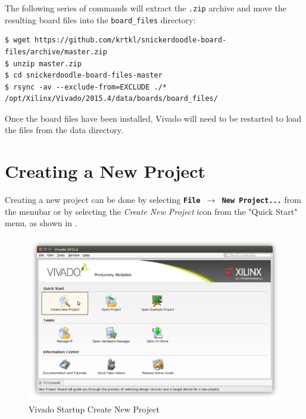 \noindent
The following series of commands will extract the \texttt{.zip} archive and move the resulting board files into the \texttt{board\_files} directory: \\

\begin{fullwidth}
\begin{lstlisting}[style=text]
$ wget https://github.com/krtkl/snickerdoodle-board-files/archive/master.zip
$ unzip master.zip
$ cd snickerdoodle-board-files-master
$ rsync -av --exclude-from=EXCLUDE ./* /opt/Xilinx/Vivado/2015.4/data/boards/board_files/
\end{lstlisting}
\end{fullwidth}

\noindent
Once the board files have been installed, Vivado will need to be restarted to load the files from the data directory.

\section{Creating a New Project}

Creating a new project can be done by selecting \texttt{\bfseries File $\rightarrow$ New Project...} from the menubar or by selecting the \textit{Create New Project} icon from the "Quick Start" menu, as shown in . \\


\begin{figure}
	\centering
	\includegraphics{images/Vivado_Start_Create_Project.png}
	\caption[Vivado Startup Create New Project]{Vivado Startup Create New Project}
	\label{fig:vivadostartcreate}
\end{figure}


